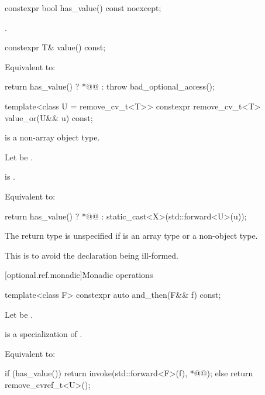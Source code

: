 \begin{itemdecl}
constexpr bool has_value() const noexcept;
\end{itemdecl}

\begin{itemdescr}
\pnum
\returns
{}.
\end{itemdescr}

\begin{itemdecl}
constexpr T& value() const;
\end{itemdecl}

\begin{itemdescr}
\pnum
\effects
Equivalent to:
\begin{codeblock}
return has_value() ? *@@ : throw bad_optional_access();
\end{codeblock}
\end{itemdescr}

\begin{itemdecl}
template<class U = remove_cv_t<T>> constexpr remove_cv_t<T> value_or(U&& u) const;
\end{itemdecl}

\begin{itemdescr}
\pnum
\constraints
{} is a non-array object type.

\pnum
 Let  be .

\pnum
\mandates
{} is .

\pnum
\effects
 Equivalent to:
\begin{codeblock}
return has_value() ? *@@ : static_cast<X>(std::forward<U>(u));
\end{codeblock}

\pnum
\remarks
The return type is unspecified if
 is an array type or a non-object type.
\begin{note}
This is to avoid the declaration being ill-formed.
\end{note}
\end{itemdescr}

[optional.ref.monadic]{Monadic operations}

\begin{itemdecl}
template<class F> constexpr auto and_then(F&& f) const;
\end{itemdecl}

\begin{itemdescr}
\pnum
Let  be .

\pnum
\mandates
{} is a specialization of .

\pnum
\effects
  Equivalent to:
\begin{codeblock}
if (has_value()) {
  return invoke(std::forward<F>(f), *@@);
} else {
  return remove_cvref_t<U>();
}
\end{codeblock}
\end{itemdescr}

